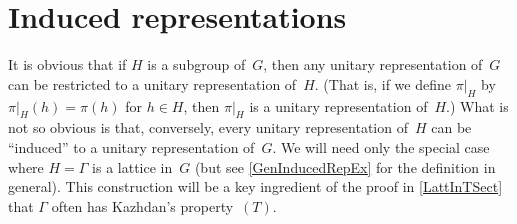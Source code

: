 \section{Induced representations} \label{InducedRepSect}

It is obvious that if $H$ is a subgroup of~$G$, then any unitary representation of~$G$ can be restricted to a unitary representation of~$H$. (That is, if we define $\pi|_H$ by $\pi|_H(h) = \pi(h)$ for $h \in H$, then $\pi|_H$ is a unitary representation of~$H$.) What is not so obvious is that, conversely, every unitary representation of~$H$ can be ``induced'' to a unitary representation of~$G$. We will need only the special case where $H = \Gamma$ is a lattice in~$G$ (but see \cref{GenInducedRepEx} for the definition in general). This construction will be a key ingredient of the proof in \cref{LattInTSect} that $\Gamma$ often has Kazhdan's property~$(T)$.

